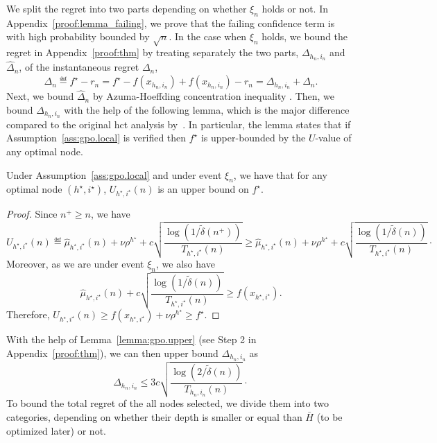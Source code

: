 We split the regret into two parts depending on whether $\xi_n$ holds or not.
In Appendix~\ref{proof:lemma_failing}, we prove that the failing confidence term is with high probability bounded by $\sqrt{n}$. In the case when  $\xi_n$ holds, we bound the regret in Appendix~\ref{proof:thm}
by treating separately the two parts, $\Delta_{h_n,i_n}$ and $\hat{\Delta}_n$, of the instantaneous regret $\Delta_n$,
\[
\Delta_n \eqdef f^\star - r_n = f^\star - f(x_{h_n,i_n}) + f(x_{h_n,i_n}) - r_n = \Delta_{h_n,i_n} + \hat{\Delta}_n.
\]
Next, we bound $ \hat{\Delta}_n$ by Azuma-Hoeffding concentration inequality \citep{azuma1967}.
Then, we bound $ \Delta_{h_n,i_n}$  with the help of the following lemma, which is the major difference compared to the original \gls{hct} analysis by~\cite{azar2014online}. In particular, the lemma states that
if Assumption~\ref{ass:gpo.local} is verified then
 $f^\star$ is upper-bounded by the $U$-value of any optimal node.
\begin{lemma}\label{lemma:gpo.upper}
\begin{leftbar}[lemmabar]
Under Assumption~\ref{ass:gpo.local} and under event $\xi_n$, we have that for any optimal node $(h^\star,i^\star)$, $U_{h^\star,i^\star}(n)$ is an upper bound on $f^\star$.
\end{leftbar}
\end{lemma}

\begin{proof}
Since $n^+ \geq n$, we have
\[
	U_{h^\star,i^\star}(n) \eqdef \hat{\mu}_{h^\star,i^\star}(n) + \nu\rho^{h^\star} + c\sqrt{\frac{\operatorname{log}(1/\tilde{\delta}(n^+))}{T_{h^\star,i^\star}(n)}} \geq \hat{\mu}_{h^\star,i^\star}(n) + \nu\rho^{h^\star} + c\sqrt{\frac{\operatorname{log}(1/\tilde{\delta}(n))}{T_{h^\star,i^\star}(n)}}\cdot
\]
Moreover, as we are under event $\xi_n$, we also have
\[
	\hat{\mu}_{h^\star,i^\star}(n) + c\sqrt{\frac{\operatorname{log}(1/\tilde{\delta}(n))}{T_{h^\star,i^\star}(n)}} \geq f\left(x_{h^\star,i^\star}\right).
\]
Therefore, $U_{h^\star,i^\star}(n) \geq f(x_{h^\star,i^\star}) + \nu\rho^{h^\star} \geq f^\star$.
\end{proof}
\noindent With the help of Lemma~\ref{lemma:gpo.upper} (see Step 2 in Appendix~\ref{proof:thm}), we can then upper bound $\Delta_{h_n,i_n}$ as
\[
\Delta_{h_n,i_n} \leq 3c\sqrt{\frac{\operatorname{log}(2/\tilde{\delta}(n))}{T_{h_n,i_n}(n)}}\cdot%
\]
To bound the total regret of the all nodes selected, we divide them
into two categories, depending on whether their depth is smaller or equal than $\bar H$
(to be optimized later) or not.

